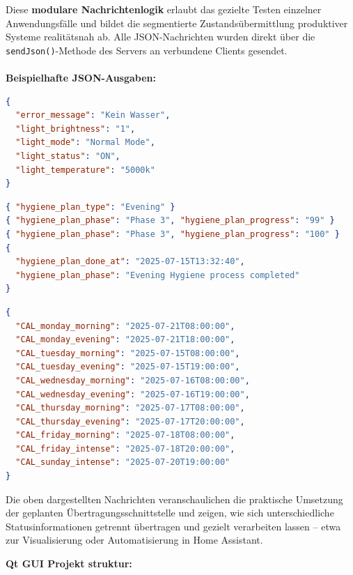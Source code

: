 Diese \textbf{modulare Nachrichtenlogik} erlaubt das gezielte Testen einzelner Anwendungsfälle und bildet die segmentierte Zustandsübermittlung produktiver Systeme realitätsnah ab. Alle JSON-Nachrichten wurden direkt über die \texttt{sendJson()}-Methode des Servers an verbundene Clients gesendet.\\\\

\textbf{Beispielhafte JSON-Ausgaben:}


\begin{lstlisting}[language=json,caption={Lichtstatus und Fehlermeldung},label={lst:json-light}]
{
  "error_message": "Kein Wasser",
  "light_brightness": "1",
  "light_mode": "Normal Mode",
  "light_status": "ON",
  "light_temperature": "5000k"
}
\end{lstlisting}

\begin{lstlisting}[language=json,caption={Dynamische Hygieneplan-Daten},label={lst:json-hygiene}]
{ "hygiene_plan_type": "Evening" }
{ "hygiene_plan_phase": "Phase 3", "hygiene_plan_progress": "99" }
{ "hygiene_plan_phase": "Phase 3", "hygiene_plan_progress": "100" }
{ 
  "hygiene_plan_done_at": "2025-07-15T13:32:40", 
  "hygiene_plan_phase": "Evening Hygiene process completed" 
}
\end{lstlisting}

\begin{lstlisting}[language=json,caption={Geplanter Hygienezeitplan (Wochentage)},label={lst:json-calendar}]
{
  "CAL_monday_morning": "2025-07-21T08:00:00",
  "CAL_monday_evening": "2025-07-21T18:00:00",
  "CAL_tuesday_morning": "2025-07-15T08:00:00",
  "CAL_tuesday_evening": "2025-07-15T19:00:00",
  "CAL_wednesday_morning": "2025-07-16T08:00:00",
  "CAL_wednesday_evening": "2025-07-16T19:00:00",
  "CAL_thursday_morning": "2025-07-17T08:00:00",
  "CAL_thursday_evening": "2025-07-17T20:00:00",
  "CAL_friday_morning": "2025-07-18T08:00:00",
  "CAL_friday_intense": "2025-07-18T20:00:00",
  "CAL_sunday_intense": "2025-07-20T19:00:00"
}
\end{lstlisting}

\noindent Die oben dargestellten Nachrichten veranschaulichen die praktische Umsetzung der geplanten Übertragungsschnittstelle und zeigen, wie sich unterschiedliche Statusinformationen getrennt übertragen und gezielt verarbeiten lassen – etwa zur Visualisierung oder Automatisierung in Home Assistant.

\vspace{1cm}
\textbf{\large Qt GUI Projekt struktur:} 

